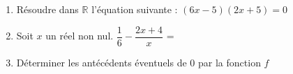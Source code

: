 \documentclass[a4paper,11pt]{article}
\begin{document}
\begin{seance}{} %

\begin{enumerate}
\item Résoudre dans $\mathbb R$ l'équation suivante : $(6x-5)(2x+5)=0$ \dotfill

\dotfill

\dotfill

\item Soit $x$ un réel non nul. $\dfrac{1}{6}-\dfrac{2x+4}{x}$ = \dotfill

\dotfill

\dotfill

\item Déterminer les antécédents éventuels de $0$ par la fonction $f$ \dotfill
\begin{center}

\begin{tikzpicture}[baseline,scale = 0.75]


\end{tikzpicture}
\end{center}
\end{enumerate}
\end{seance}
\end{document}
